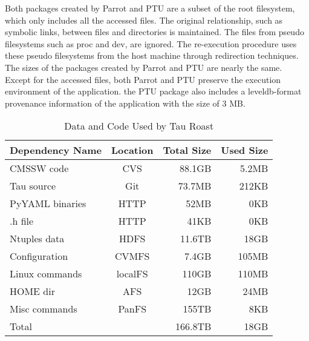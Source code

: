 Both packages created by Parrot and PTU are a subset of the root filesystem, which only includes all the accessed files. The original relationship, such as symbolic links, between files and directories is maintained. The files from pseudo filesystems such as proc and dev, are ignored. The re-execution procedure uses these pseudo filesystems from the host machine through redirection techniques.
The sizes of the packages created by Parrot and PTU are nearly the same. 
Except for the accessed files, both Parrot and PTU preserve the execution environment of the application. 
the PTU package also includes a leveldb-format provenance information of the application with the size of 3 MB.

\begin{table}
\small
	\centering
	    \begin{tabular}{lcrr}
	        \hline
	        \bf Dependency Name & \bf Location & \bf Total Size &  \bf Used Size\\ 
	        \hline
	        CMSSW code     & CVS & 88.1GB &  5.2MB\\ \hline
	        Tau source       & Git & 73.7MB & 212KB \\ \hline
	        PyYAML binaries    & HTTP & 52MB& 0KB \\ \hline
	        .h file       & HTTP& 41KB & 0KB \\ \hline \hline
	        Ntuples data    & HDFS& 11.6TB & 18GB \\ \hline
	        Configuration & CVMFS & 7.4GB & 105MB \\ \hline
	        Linux commands & localFS & 110GB & 110MB \\ \hline     
	        HOME dir& AFS &12GB & 24MB\\ \hline
	        Misc commands & PanFS & 155TB & 8KB \\ \hline
	        Total      &    & 166.8TB     &  18GB \\ \hline
	    \end{tabular}
	    \normalsize
	    \caption{Data and Code Used by Tau Roast}
	    \label{table:size-original-real}
\end{table}
	   

